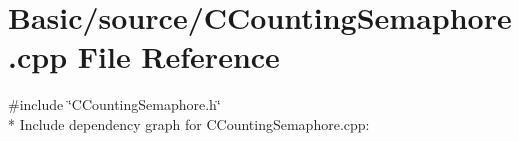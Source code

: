 \section{Basic/source/\-C\-Counting\-Semaphore.cpp File Reference}
\label{CCountingSemaphore_8cpp}
{\ttfamily \#include \char`\"{}C\-Counting\-Semaphore.\-h\char`\"{}}\\*
Include dependency graph for C\-Counting\-Semaphore.\-cpp\-:
